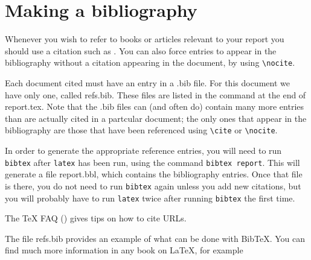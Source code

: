 \chapter{Making a bibliography}
\label{cha:bib}
Whenever you wish to refer to books or articles relevant to your report
you should use a citation such as \cite{lamport}. You can also force
entries to appear in the bibliography without  a citation appearing in
the document, by using \verb=\nocite=.  

\nocite{boyle,rd-only} 

Each document cited must have an entry in a \textsf{.bib} file. For this
document we have only one, called \textsf{refs.bib}. These files are
listed in the \verb== command at the end of
\textsf{report.tex}. Note that the \textsf{.bib} files can (and often
do) contain many more entries than are actually cited in a partcular
document; the only ones that appear in the bibliography are those that
have been referenced using \verb=\cite= or \verb=\nocite=.

In order to generate the appropriate reference entries, you will need
to run \texttt{bibtex} after \texttt{latex} has been run, using the
command \texttt{bibtex report}. This will generate a file
\textsf{report.bbl}, which contains the bibliography entries. Once
that file is there, you do not need to run \texttt{bibtex} again
unless you add new citations, but you will probably have to run
\texttt{latex} twice after running \texttt{bibtex} the first time.

The \TeX{} FAQ (\cite{url-cite}) gives tips on how to cite URLs.

The file \textsf{refs.bib} provides an example of what can be done
with Bib\TeX. You can find much more information in any book on
\LaTeX, for example \cite{huang2009network,PhysRevLett.100.118703,CHOPRA2015865,CHEN2015224}


